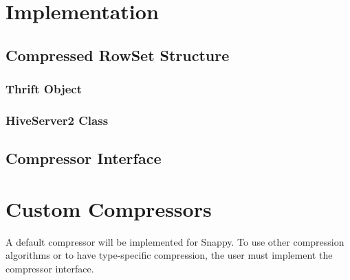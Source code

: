 \documentclass[11pt,a4paper]{article}
\begin{document}
\section{Implementation}
	\subsection{Compressed RowSet Structure}
	\subsubsection{Thrift Object}
	\subsubsection{HiveServer2 Class}
	
	\subsection{Compressor Interface}


\section{Custom Compressors}
		A default compressor will be implemented for Snappy.
		To use other compression algorithms or to have type-specific compression, the user must implement the compressor interface.
\end{document}
